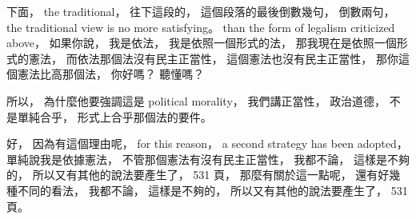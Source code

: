 \hypertarget{w02:cue:1764}{}下面，
\hypertarget{w02:cue:1765}{}the traditional，
\hypertarget{w02:cue:1766}{}往下這段的，
\hypertarget{w02:cue:1767}{}這個段落的最後倒數幾句，
\hypertarget{w02:cue:1768}{}倒數兩句，
\hypertarget{w02:cue:1769}{}the traditional view is no more satisfying。
\hypertarget{w02:cue:1770}{}than the form of legalism criticized above，
\hypertarget{w02:cue:1771}{}如果你說，
\hypertarget{w02:cue:1772}{}我是依法，
\hypertarget{w02:cue:1773}{}我是依照一個形式的法，
\hypertarget{w02:cue:1774}{}那我現在是依照一個形式的憲法，
\hypertarget{w02:cue:1775}{}而依法那個法沒有民主正當性，
\hypertarget{w02:cue:1776}{}這個憲法也沒有民主正當性，
\hypertarget{w02:cue:1777}{}那你這個憲法比高那個法，
\hypertarget{w02:cue:1778}{}你好嗎？
\hypertarget{w02:cue:1779}{}聽懂嗎？

\hypertarget{w02:cue:1780}{}所以，
\hypertarget{w02:cue:1781}{}為什麼他要強調這是 political morality，
\hypertarget{w02:cue:1782}{}我們講正當性，
\hypertarget{w02:cue:1783}{}政治道德，
\hypertarget{w02:cue:1784}{}不是單純合乎，
\hypertarget{w02:cue:1785}{}形式上合乎那個法的要件。

\hypertarget{w02:cue:1786}{}好，
\hypertarget{w02:cue:1787}{}因為有這個理由呢，
\hypertarget{w02:cue:1788}{}for this reason，
\hypertarget{w02:cue:1789}{}a second strategy has been adopted，
\hypertarget{w02:cue:1790}{}單純說我是依據憲法，
\hypertarget{w02:cue:1791}{}不管那個憲法有沒有民主正當性，
\hypertarget{w02:cue:1792}{}我都不論，
\hypertarget{w02:cue:1793}{}這樣是不夠的，
\hypertarget{w02:cue:1794}{}所以又有其他的說法要產生了，
\hypertarget{w02:cue:1795}{}531 頁，
\hypertarget{w02:cue:1796}{}那麼有關於這一點呢，
\hypertarget{w02:cue:1797}{}還有好幾種不同的看法，
\hypertarget{w02:cue:1802}{}我都不論，
\hypertarget{w02:cue:1803}{}這樣是不夠的，
\hypertarget{w02:cue:1804}{}所以又有其他的說法要產生了，
\hypertarget{w02:cue:1805}{}531 頁。

